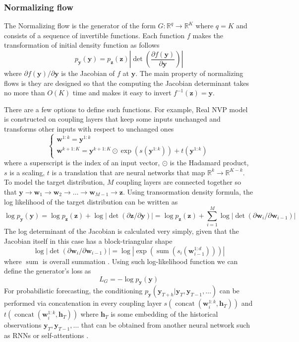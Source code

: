 \documentclass[12pt,a4paper]{article}
\begin{document}
\subsubsection{Normalizing flow}

The Normalizing flow \cite{normflow2021} is the generator of the form $G: \mathbb R^q \to \mathbb R^K$ where $q=K$ and consists of a sequence of invertible functions. Each function $f$ makes the transformation of initial density function as follows
$$p_{\mathbf{y}}(\mathbf{y})=p_{\mathbf{z}}(\mathbf{z})\left|\operatorname{det}\left(\frac{\partial f(\mathbf{y})}{\partial \mathbf{y}}\right)\right|$$
where $\partial f(\mathbf y)/\partial \mathbf y$ is the Jacobian of $f$ at $\mathbf y$. The main property of normalizing flows is they are designed so that the computing the Jacobian determinant takes no more than  $O(K)$ time and makes it easy to invert $f^{-1}(\mathbf z) = \mathbf y$.

There are a few options to define such functions. For example, Real NVP \cite{normflow2021} model is constructed on coupling layers that keep some inputs unchanged and transforms other inputs with respect to unchanged ones
$$
\begin{cases}
    \mathbf w^{1:k} = \mathbf y^{1:k} \\
    \mathbf w^{k+1:K} = \mathbf y^{k+1:K} \odot \exp(s(\mathbf y^{1:k})) + t(\mathbf y^{1:k})
\end{cases}
$$
where a superscript is the index of an input vector, $\odot$ is the Hadamard product, $s$ is a scaling, $t$ is a translation that are neural networks that map $\mathbb R^k \to \mathbb R^{K-k}$. To model the target distribution, $M$ coupling layers are connected together so that $\mathbf{y} \to \mathbf{w}_1 \to \mathbf{w}_2 \to \dots \to \mathbf{w}_{M-1} \to \mathbf{z}$. Using transormation density formula, the log likelihood of the target distribution can be written as
$$\log p_{\mathbf{y}}(\mathbf{y})=\log p_{\mathbf{z}}(\mathbf{z})+\log |\operatorname{det}(\partial \mathbf{z} / \partial \mathbf{y})|=\log p_{\mathbf{z}}(\mathbf{z})+\sum_{i=1}^{M} \log \left|\operatorname{det}\left(\partial \mathbf{w}_{i} / \partial \mathbf{w}_{i-1}\right)\right|$$
The log determinant of the Jacobian is calculated very simply, given that the Jacobian itself in this case has a block-triangular shape 
$$\log \left|\operatorname{det}\left(\partial \mathbf{w}_{i} / \partial \mathbf{w}_{i-1}\right)\right| = \log \left| \exp \left(\operatorname{sum}\left(s_{i}\left(\mathbf{w}_{i-1}^{1: d}\right)\right) \right) \right|$$
where $\operatorname{sum}$ is overall summation \cite{normflow2021}. Using such log-likelihood function we can define the generator's loss as
$$L_G = -\log p_\mathbf{y}(\mathbf y)$$
For probabilistic forecasting, the conditioning $p_\mathbf{y}(\mathbf{y}_{T+h}| \mathbf{y}_T, \mathbf y_{T-1}, \dots)$ can be performed via concatenation in every coupling layer $s(\operatorname{concat}(\mathbf w_i^{1:k}, \mathbf h_T))$ and $t(\operatorname{concat}(\mathbf w_i^{1:k}, \mathbf h_T))$ where $\mathbf{h}_T$ is some embedding of the historical observations $\mathbf y_{T}, \mathbf y_{T-1}, \dots$ that can be obtained from another neural network such as RNNs or self-attentions \cite{normflow2021}.
\end{document}
